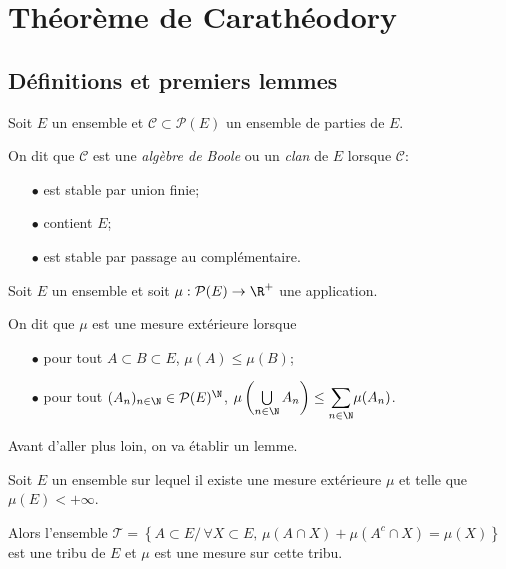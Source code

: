 

\section{Théorème de Carathéodory}

\subsection{Définitions et premiers lemmes}

\begin{de}
Soit $E$ un ensemble et $\mathcal{C} \subset \mathcal{P}(E)$ un ensemble de parties de $E$.

On dit que $\mathcal{C}$ est une \emph{algèbre de Boole} ou un \emph{clan} de $E$ lorsque $\mathcal{C}$:
\begin{itemize}
\item[$\bullet$] est stable par union finie;
\item[$\bullet$] contient $E$;
\item[$\bullet$] est stable par passage au complémentaire.
\end{itemize}
\end{de}

\begin{de}
Soit $E$ un ensemble et soit $\mu: \mathcal{P}(E) \to \R^{+}$ une application.

On dit que $\mu$ est une mesure extérieure lorsque
\begin{itemize}
\item[$\bullet$] pour tout $A \subset B \subset E$, $\mu(A) \leq \mu(B)$;
\item[$\bullet$] pour tout $(A_n)_{n \in \N} \in \mathcal{P}(E)^{\N}$, $\mu\left(\bigcup \limits_{n \in \N} A_n\right) \leq \displaystyle{\sum \limits_{n \in \N}} \mu(A_n)$.
\end{itemize}

\end{de}


Avant d'aller plus loin, on va établir un lemme.

\begin{lem}
\label{lemme_caratheodory}
Soit $E$ un ensemble sur lequel il existe une mesure extérieure $\mu$ et telle que $\mu(E)<+\infty$.
%


Alors l'ensemble $\mathcal{T} = \left \{ A \subset E/ \, \forall X \subset E, \, \mu(A \cap X) + \mu(A^c \cap X) = \mu(X)\right \}$ est une tribu de $E$ et $\mu$ est une mesure sur cette tribu.
\end{lem}

